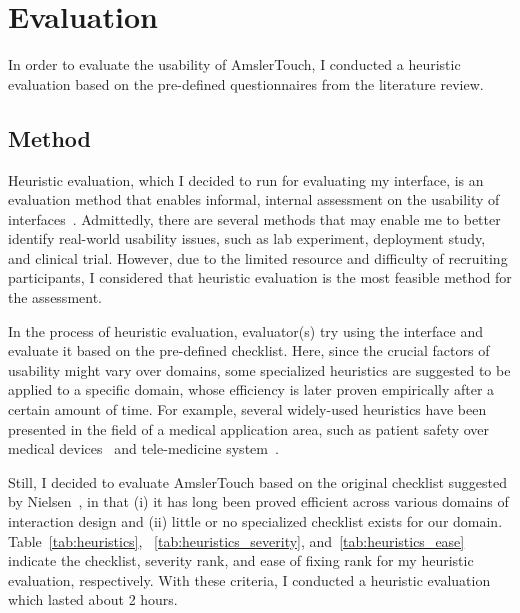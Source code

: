 \section{Evaluation}

In order to evaluate the usability of AmslerTouch, I conducted a heuristic evaluation based on the pre-defined questionnaires from the literature review.

\subsection{Method}

Heuristic evaluation, which I decided to run for evaluating my interface, is an evaluation method that enables informal, internal assessment on the usability of interfaces~\cite{nielsen1990heuristic}. Admittedly, there are several methods that may enable me to better identify real-world usability issues, such as lab experiment, deployment study, and clinical trial. However, due to the limited resource and difficulty of recruiting participants, I considered that heuristic evaluation is the most feasible method for the assessment.


In the process of heuristic evaluation, evaluator(s) try using the interface and evaluate it based on the pre-defined checklist. Here, since the crucial factors of usability might vary over domains, some specialized heuristics are suggested to be applied to a specific domain, whose efficiency is later proven empirically after a certain amount of time. For example, several widely-used heuristics have been presented in the field of a medical application area, such as patient safety over medical devices~\cite{zhang2003using} and tele-medicine system~\cite{tang2006applying}.

Still, I decided to evaluate AmslerTouch based on the original checklist suggested by Nielsen~\cite{nielsen1994heuristic}, in that (i) it has long been proved efficient across various domains of interaction design and (ii) little or no specialized checklist exists for our domain. Table~\ref{tab:heuristics}, ~\ref{tab:heuristics_severity}, and~\ref{tab:heuristics_ease} indicate the checklist, severity rank, and ease of fixing rank for my heuristic evaluation, respectively. With these criteria, I conducted a heuristic evaluation which lasted about 2 hours.


